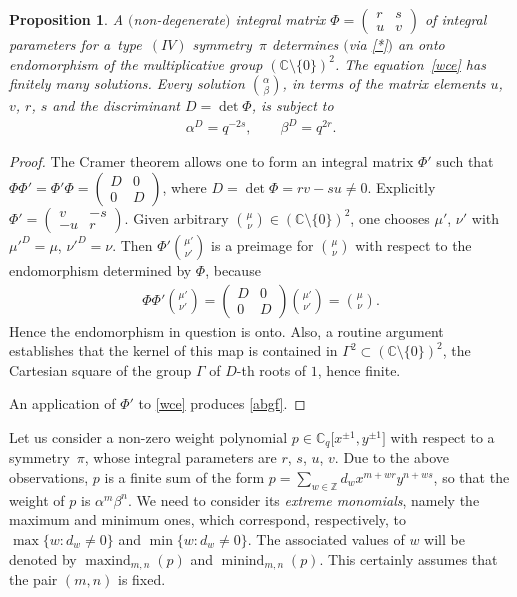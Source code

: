 \documentclass[10pt,a4paper]{amsart}
\numberwithin{equation}{section}
\newtheorem{Proposition}[Theorem]{Proposition}
 { \theoremstyle{definition}
\newtheorem{Definition}[Theorem]{Definition}
\newtheorem{Remark}[Theorem]{Remark} }
\begin{document}
\begin{Proposition}A $($non-degenerate$)$ integral matrix $\Phi=\left(\begin{smallmatrix}r & s\\ u & v\end{smallmatrix}\right)$ of integral parameters for a~type~$(IV)$ symmetry~$\pi$ determines $($via \eqref{*}$)$ an onto endomorphism of the multiplicative group $(\mathbb{C}{\setminus}\{0\})^2$. The equation~\eqref{wce} has finitely many solutions. Every solution $\binom{\alpha}{\beta}$, in terms of the matrix elements $u$, $v$, $r$, $s$ and the discriminant $D=\det\Phi$, is subject to
\begin{gather}\label{abgf}
\alpha^D=q^{-2s},\qquad\beta^D=q^{2r}.
\end{gather}
\end{Proposition}

\begin{proof} The Cramer theorem allows one to form an integral matrix $\Phi'$ such that $\Phi\Phi'=\Phi'\Phi=\left(\begin{smallmatrix}D & 0\\ 0 & D\end{smallmatrix}\right)$, where $D=\det\Phi=rv-su\ne 0$. Explicitly $\Phi'=\left(\begin{smallmatrix}v & -s\\ -u & r\end{smallmatrix}\right)$. Given arbitrary $\binom{\mu}{\nu}\in(\mathbb{C}{\setminus}\{0\})^2$, one chooses $\mu'$, $\nu'$ with $\mu'^D=\mu$, $\nu'^D=\nu$. Then $\Phi'\binom{\mu'}{\nu'}$ is a preimage for $\binom{\mu}{\nu}$ with respect to the endomorphism determined by $\Phi$, because
\begin{gather*}
\Phi\Phi'\binom{\mu'}{\nu'}=\begin{pmatrix}D & 0\\ 0 & D\end{pmatrix}\binom{\mu'}{\nu'}=\binom{\mu}{\nu}.
\end{gather*}
Hence the endomorphism in question is onto. Also, a routine argument establishes that the kernel of this map is contained in $\Gamma^2\subset(\mathbb{C}{\setminus}\{0\})^2$, the Cartesian square of the group $\Gamma$ of $D$-th roots of $1$, hence finite.

An application of $\Phi'$ to \eqref{wce} produces \eqref{abgf}.
\end{proof}


Let us consider a non-zero weight polynomial $p\in\mathbb{C}_q\big[x^{\pm 1},y^{\pm 1}\big]$ with respect to a symmet\-ry~$\pi$, whose integral parameters are $r$, $s$, $u$, $v$. Due to the above observations, $p$ is a finite sum of the form $p=\sum\limits_{w\in\mathbb{Z}}d_wx^{m+wr}y^{n+ws}$, so that the weight of $p$ is $\alpha^m\beta^n$. We need to consider its {\it extreme monomials}, namely the maximum and minimum ones, which correspond, respectively, to $\max\{w\colon d_w\ne 0\}$ and $\min\{w\colon d_w\ne 0\}$. The associated values of $w$ will be denoted by $\operatorname{maxind}_{m,n}(p)$ and $\operatorname{minind}_{m,n}(p)$. This certainly assumes that the pair $(m,n)$ is fixed.
\end{document}
